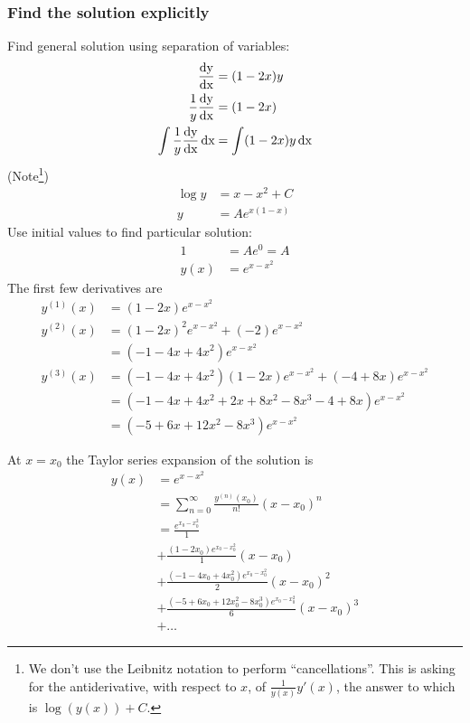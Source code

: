 \documentclass[12pt]{article}
\begin{document}
\subsubsection*{Find the solution explicitly}
Find general solution using separation of variables:
\begin{align*}
  \frac{\operatorname{\text{dy}}}{\operatorname{\text{dx}}} &= (1 - 2x)y\\
  \frac{1}{y}\frac{\operatorname{\text{dy}}}{\operatorname{\text{dx}}} &= (1 - 2x)\\
  \int \frac{1}{y} \frac{\operatorname{\text{dy}}}{\operatorname{\text{dx}}} \operatorname{\text{dx}} &= \int (1 - 2x)y \operatorname{\text{dx}}
\end{align*}
(Note\footnote{We don't use the Leibnitz notation to perform
  ``cancellations''. This is asking for the antiderivative, with respect to
  $x$, of $\frac{1}{y(x)}y'(x)$, the answer to which is $\log(y(x)) + C$.})
\begin{align*}
  \log y  &= x - x^2 + C\\
  y &= Ae^{x(1-x)}
\end{align*}
Use initial values to find particular solution:
\begin{align*}
  1 &= Ae^0 = A\\
  y(x) &= e^{x - x^2}
\end{align*}
The first few derivatives are
\begin{align*}
y^{(1)}(x) &= (1 - 2x)e^{x - x^2}\\
y^{(2)}(x) &= (1 - 2x)^2e^{x - x^2} + (-2)e^{x - x^2}\\
          &= (-1 - 4x + 4x^2)e^{x - x^2}\\
y^{(3)}(x) &= (-1 - 4x + 4x^2)(1 - 2x)e^{x - x^2} + (-4 + 8x)e^{x - x^2}\\
           &= (-1 - 4x + 4x^2 + 2x + 8x^2 - 8x^3 - 4 + 8x)e^{x - x^2}\\
           &= (-5 + 6x + 12x^2 - 8x^3)e^{x - x^2}
\end{align*}

At $x=x_0$ the Taylor series expansion of the solution is
\begin{align*}
  y(x) &= e^{x - x^2}\\
       &= \sum_{n=0}^\infty \frac{y^{(n)}(x_0)}{n!} (x - x_0)^n\\
       &= \frac{e^{x_0 - x_0^2}}{1}\\
       &+ \frac{(1 - 2x_0)e^{x_0 - x_0^2}}{1} (x - x_0)\\
       &+ \frac{(-1 - 4x_0 + 4x_0^2)e^{x_0 - x_0^2}}{2} (x - x_0)^2\\
       &+ \frac{(-5 + 6x_0 + 12x_0^2 - 8x_0^3)e^{x_0 - x_0^2}}{6} (x - x_0)^3\\
       &+ \ldots
\end{align*}
\end{document}

